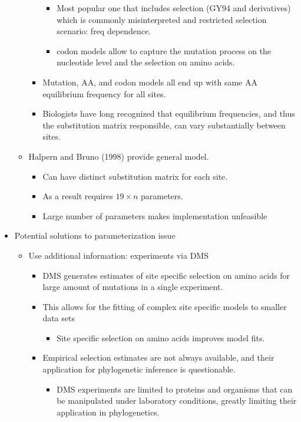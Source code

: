 \documentclass[12pt]{article}
\begin{document}
\begin{itemize}
\begin{itemize}
\begin{itemize}
\begin{itemize}
				\item Most popular one that includes selection (GY94 and derivatives) which is commonly misinterpreted and restricted selection scenario: freq dependence.
				\item codon models allow to capture the mutation process on the nucleotide level and the selection on amino acids.
			\end{itemize}
			\item Mutation, AA, and codon models all end up with same AA equilibrium frequency for all sites.
			\item Biologists have long recognized that equilibrium frequencies, and thus the substitution matrix responsible, can vary substantially between sites.
		\end{itemize}
		\item Halpern and Bruno (1998) provide general model.
		\begin{itemize}
			\item Can have distinct substitution matrix for each site.
			\item As a result requires $19 \times n$ parameters.
			\item Large number of parameters makes implementation unfeasible
		\end{itemize}
	\end{itemize}
	\item Potential solutions to parameterization issue
	\begin{itemize}
		\item Use additional information: experiments via DMS
		\begin{itemize}
			\item DMS generates estimates of site specific selection on amino acids for large amount of mutations in a single experiment.
			\item This allows for the fitting of complex site specific models to smaller data sets
			\begin{itemize}
				\item Site specific selection on amino acids improves model fits.
			\end{itemize}
			\item Empirical selection estimates are not always available, and their application for phylogenetic inference is questionable.
			\begin{itemize}
				\item DMS experiments are limited to proteins and organisms that can be manipulated under laboratory conditions, greatly limiting their application in phylogenetics.

\end{itemize}
\end{itemize}
\end{itemize}
\end{itemize}
\end{document}
